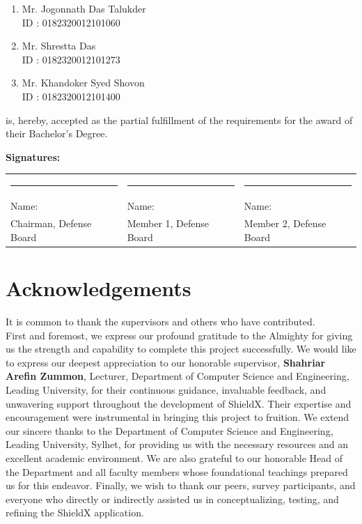 \documentclass[12pt, a4paper, twoside]{report}
\begin{document}
\begin{enumerate}[label=\arabic*.]
    \item Mr. Jogonnath Das Talukder\\
          ID : 0182320012101060
    \item Mr. Shrestta Das\\
          ID : 0182320012101273
    \item Mr. Khandoker Syed Shovon\\
          ID : 0182320012101400
\end{enumerate}

is, hereby, accepted as the partial fulfillment of the requirements for the award of their Bachelor's Degree.
\vspace{3cm}

\noindent\textbf{Signatures:}\\[2cm]
\noindent
\begin{tabularx}{\textwidth}{@{}XXX@{}}
    \rule{4.5cm}{0.4pt} & \rule{4.5cm}{0.4pt} & \rule{4.5cm}{0.4pt} \\
    Name: & Name: & Name: \\[0.5cm]
    Chairman, Defense Board & Member 1, Defense Board & Member 2, Defense Board
\end{tabularx}
\clearpage
\chapter*{Acknowledgements}
It is common to thank the supervisors and others who have contributed.\\[0.5cm]
First and foremost, we express our profound gratitude to the Almighty for giving us the strength and capability to complete this project successfully.
We would like to express our deepest appreciation to our honorable supervisor, \textbf{Shahriar Arefin Zummon}, Lecturer, Department of Computer Science and Engineering, Leading University, for their continuous guidance, invaluable feedback, and unwavering support throughout the development of ShieldX. Their expertise and encouragement were instrumental in bringing this project to fruition.
We extend our sincere thanks to the Department of Computer Science and Engineering, Leading University, Sylhet, for providing us with the necessary resources and an excellent academic environment. We are also grateful to our honorable Head of the Department and all faculty members whose foundational teachings prepared us for this endeavor.
Finally, we wish to thank our peers, survey participants, and everyone who directly or indirectly assisted us in conceptualizing, testing, and refining the ShieldX application.
\end{document}
